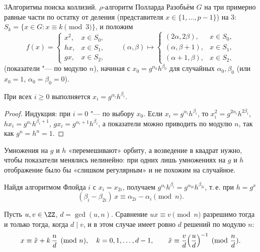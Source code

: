 \begin{lecture}{3}{Алгоритмы поиска коллизий. \texorpdfstring{$\rho$}{ρ}-алгоритм Полларда}
Разобьём $G$ на три примерно равные части по остатку от деления (представителя
$x \in \{1, \dots, p - 1\}$) на $3$: $S_k = \{x \in G : x \equiv k \pmod 3\}$, и положим
\[
  f(x) = \begin{cases}
    x^2, & x \in S_0,\\
    h x, & x \in S_1,\\
    g x, & x \in S_2,
  \end{cases}
  \qquad
  (\alpha, \beta) \mapsto \begin{cases}
    (2\alpha, 2\beta), & x \in S_0,\\
    (\alpha, \beta + 1), & x \in S_1,\\
    (\alpha + 1, \beta), & x \in S_2,
  \end{cases}
\]
(показатели "--- по модулю $n$), начиная с $x_0 = g^{\alpha_0} h^{\beta_0}$ для случайных
$\alpha_0, \beta_0$ (или $x_0 = 1$, $\alpha_0 = \beta_0 = 0$).

\begin{lemma}\label{l3:invariant}
При всех $i \ge 0$ выполняется $x_i = g^{\alpha_i} h^{\beta_i}$.
\end{lemma}

\begin{proof}
Индукция: при $i = 0$ "--- по выбору $x_0$. Если $x_i = g^{\alpha_i} h^{\beta_i}$, то
$x_i^2 = g^{2\alpha_i} h^{2\beta_i}$, $h x_i = g^{\alpha_i} h^{\beta_i + 1}$,
$g x_i = g^{\alpha_i + 1} h^{\beta_i}$, а показатели можно приводить по модулю $n$,
так как $g^n = h^n = 1$.
\end{proof}

Умножения на $g$ и $h$ «перемешивают» орбиту, а возведение в квадрат нужно, чтобы показатели
менялись нелинейно: при одних лишь умножениях на $g$ и $h$ отображение было бы «слишком
регулярным» и не похожим на случайное.

Найдя алгоритмом Флойда $i$ с $x_i = x_{2i}$, получаем
$g^{\alpha_i} h^{\beta_i} = g^{\alpha_{2i}} h^{\beta_{2i}}$, т.\,е. при $h = g^x$
\begin{equation}\label{l3:congruence}
  (\beta_i - \beta_{2i})\, x \equiv \alpha_{2i} - \alpha_i \pmod n.
\end{equation}

\begin{lemma}\label{l3:linear}
Пусть $u, v \in \ZZ$, $d = \gcd(u, n)$. Сравнение $u x \equiv v \pmod n$ разрешимо тогда
и только тогда, когда $d \mid v$, и в этом случае имеет ровно $d$ решений по модулю $n$:
\[
  x \equiv \tilde x + k\,\frac nd \pmod n, \quad k = 0, 1, \dots, d - 1, \qquad
  \tilde x \equiv \frac vd \Bigl(\frac ud\Bigr)^{-1} \pmod{\frac nd}.
\]
\end{lemma}


\end{lecture}

